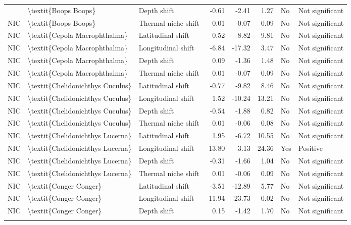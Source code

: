 \begin{longtable}[t]{lllrrrll}
{{NIC & \textbackslash{}textit\{Boops Boops\} & Depth shift & -0.61 & -2.41 & 1.27 & No & Not significant\\
NIC & \textbackslash{}textit\{Boops Boops\} & Thermal niche shift & 0.01 & -0.07 & 0.09 & No & Not significant\\
NIC & \textbackslash{}textit\{Cepola Macrophthalma\} & Latitudinal shift & 0.52 & -8.82 & 9.81 & No & Not significant\\
NIC & \textbackslash{}textit\{Cepola Macrophthalma\} & Longitudinal shift & -6.84 & -17.32 & 3.47 & No & Not significant\\
\addlinespace
NIC & \textbackslash{}textit\{Cepola Macrophthalma\} & Depth shift & 0.09 & -1.36 & 1.48 & No & Not significant\\
NIC & \textbackslash{}textit\{Cepola Macrophthalma\} & Thermal niche shift & 0.01 & -0.07 & 0.09 & No & Not significant\\
NIC & \textbackslash{}textit\{Chelidonichthys Cuculus\} & Latitudinal shift & -0.77 & -9.82 & 8.46 & No & Not significant\\
NIC & \textbackslash{}textit\{Chelidonichthys Cuculus\} & Longitudinal shift & 1.52 & -10.24 & 13.21 & No & Not significant\\
NIC & \textbackslash{}textit\{Chelidonichthys Cuculus\} & Depth shift & -0.54 & -1.88 & 0.82 & No & Not significant\\
\addlinespace
NIC & \textbackslash{}textit\{Chelidonichthys Cuculus\} & Thermal niche shift & 0.01 & -0.06 & 0.08 & No & Not significant\\
NIC & \textbackslash{}textit\{Chelidonichthys Lucerna\} & Latitudinal shift & 1.95 & -6.72 & 10.55 & No & Not significant\\
NIC & \textbackslash{}textit\{Chelidonichthys Lucerna\} & Longitudinal shift & 13.80 & 3.13 & 24.36 & Yes & Positive\\
NIC & \textbackslash{}textit\{Chelidonichthys Lucerna\} & Depth shift & -0.31 & -1.66 & 1.04 & No & Not significant\\
NIC & \textbackslash{}textit\{Chelidonichthys Lucerna\} & Thermal niche shift & 0.01 & -0.06 & 0.09 & No & Not significant\\
\addlinespace
NIC & \textbackslash{}textit\{Conger Conger\} & Latitudinal shift & -3.51 & -12.89 & 5.77 & No & Not significant\\
NIC & \textbackslash{}textit\{Conger Conger\} & Longitudinal shift & -11.94 & -23.73 & 0.02 & No & Not significant\\
NIC & \textbackslash{}textit\{Conger Conger\} & Depth shift & 0.15 & -1.42 & 1.70 & No & Not significant\\
}}
\end{longtable}
